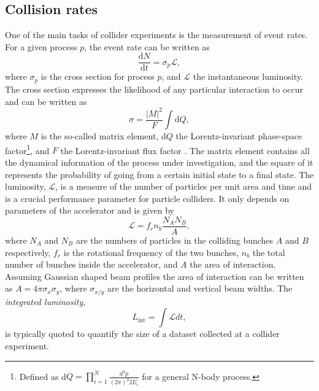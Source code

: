 \subsection{Collision rates}
\label{subsec:collision-rates}
One of the main tasks of collider experiments is the measurement of event rates. 
For a given process $p$, the event rate can be written as
\begin{equation}
  \frac{\mathrm{d}N}{\mathrm{d}t} = \sigma_p \mathcal{L},
\end{equation}
where $\sigma_p$ is the cross section for process $p$, and $\mathcal{L}$ the instantaneous luminosity.
The cross section expresses the likelihood of any particular interaction to occur and can be written as
\begin{equation}
  \label{eq:xsec}
  \sigma = \frac{|M|^2}{F} \int \text{d}Q,
\end{equation}
where $M$ is the so-called matrix element, d$Q$ the Lorentz-invariant phase-space factor\footnote{Defined as d$Q = \prod_{i = 1}^N \frac{d^3p}{(2\pi)^2 2E_i}$ for a general N-body process.}, and $F$ the Lorentz-invariant flux factor \cite{Halzen:1984mc}. 
The matrix element contains all the dynamical information of the process under investigation, and the square of it represents the probability of going from a certain initial state to a final state. 
The luminosity, $\mathcal{L}$, is a measure of the number of particles per unit area and time and is a crucial performance parameter for particle colliders. It only depends on parameters of the accelerator and is given by
\begin{equation}
  \mathcal{L} = f_rn_b\frac{N_A N_B}{A},
\end{equation}
where $N_A$ and $N_B$ are the numbers of particles in the colliding bunches $A$ and $B$ respectively, $f_r$ is the rotational frequency of the two bunches, $n_b$ the total number of bunches inside the accelerator, and $A$ the area of interaction. Assuming Gaussian shaped beam profiles the area of interaction can be written as $A = 4\pi \sigma_x \sigma_y$, where $\sigma_{x/y}$ are the horizontal and vertical beam widths.
The \emph{integrated luminosity}, 
\begin{equation}
  L_\text{int} = \int \mathcal{L} dt,
\end{equation}
is typically quoted to quantify the size of a dataset collected at a collider experiment.



